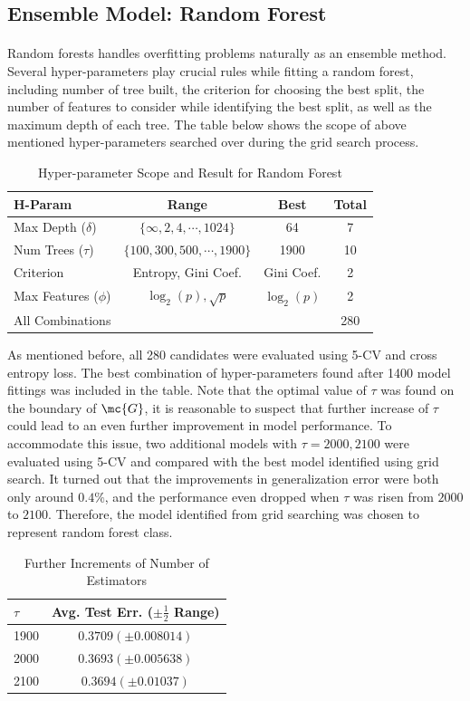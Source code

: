 \documentclass[11pt]{article}
\begin{document}
 	\subsection{Ensemble Model: Random Forest}
 	\paragraph{} Random forests handles overfitting problems naturally as an ensemble method. Several hyper-parameters play crucial rules while fitting a random forest, including number of tree built, the criterion for choosing the best split, the number of features to consider while identifying the best split, as well as the maximum depth of each tree. The table below shows the scope of above mentioned hyper-parameters searched over during the grid search process.
 	\begin{table}[H]
 		\centering
 		\begin{tabular}{l|c|c|c}
 		H-Param & Range & Best & Total \\
 		\hline
 		Max Depth ($\delta$) & $\{\infty, 2, 4, \cdots, 1024\}$ & 64 & 7 \\
 		Num Trees ($\tau$) & $\{100, 300, 500, \cdots, 1900\}$ & 1900 & 10 \\
 		Criterion & Entropy, Gini Coef. & Gini Coef. & 2 \\
 		Max Features ($\phi$) & $\log_2(p), \sqrt{p}$ & $\log_2(p)$ & 2\\
 		\hline 
 		All Combinations& & & 280
		\end{tabular}
		\caption{Hyper-parameter Scope and Result for Random Forest}
 	\end{table}
 	As mentioned before, all 280 candidates were evaluated using 5-CV and cross entropy loss. The best combination of hyper-parameters found after 1400 model fittings was included in the table. Note that the optimal value of $\tau$ was found on the boundary of $\mc{G}$, it is reasonable to suspect that further increase of $\tau$ could lead to an even further improvement in model performance. To accommodate this issue, two additional models with $\tau=2000, 2100$ were evaluated using 5-CV and compared with the best model identified using grid search. It turned out that the improvements in generalization error were both only around $0.4\%$, and the performance even dropped when $\tau$ was risen from $2000$ to $2100$. Therefore, the model identified from grid searching was chosen to represent random forest class.
 	
 	\begin{table}[H]
	 	\centering
		\begin{tabular}{l|c}
			$\tau$ & Avg. Test Err. ($\pm \frac{1}{2}$ Range) \\
			\hline
			1900 & $0.3709(\pm 0.008014)$ \\
			2000 & $0.3693(\pm 0.005638)$ \\
			2100 & $0.3694(\pm 0.01037)$ 
		\end{tabular}
		\caption{Further Increments of Number of Estimators}
	\end{table}
 
\end{document}
